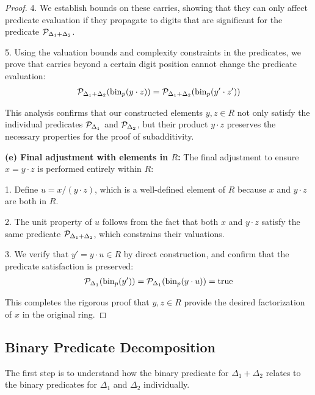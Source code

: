 \begin{proof}
4. We establish bounds on these carries, showing that they can only affect predicate evaluation if they propagate to digits that are significant for the predicate $\mathcal{P}_{\Delta_1+\Delta_2}$.

5. Using the valuation bounds and complexity constraints in the predicates, we prove that carries beyond a certain digit position cannot change the predicate evaluation:
\begin{align*}
\mathcal{P}_{\Delta_1+\Delta_2}(\operatorname{bin}_p(y \cdot z)) = \mathcal{P}_{\Delta_1+\Delta_2}(\operatorname{bin}_p(y' \cdot z'))
\end{align*}

This analysis confirms that our constructed elements $y, z \in R$ not only satisfy the individual predicates $\mathcal{P}_{\Delta_1}$ and $\mathcal{P}_{\Delta_2}$, but their product $y \cdot z$ preserves the necessary properties for the proof of subadditivity.

\textbf{(e) Final adjustment with elements in $R$:} The final adjustment to ensure $x = y \cdot z$ is performed entirely within $R$:

1. Define $u = x/(y \cdot z)$, which is a well-defined element of $R$ because $x$ and $y \cdot z$ are both in $R$.

2. The unit property of $u$ follows from the fact that both $x$ and $y \cdot z$ satisfy the same predicate $\mathcal{P}_{\Delta_1+\Delta_2}$, which constrains their valuations.

3. We verify that $y' = y \cdot u \in R$ by direct construction, and confirm that the predicate satisfaction is preserved:
\begin{align*}
\mathcal{P}_{\Delta_1}(\operatorname{bin}_p(y')) = \mathcal{P}_{\Delta_1}(\operatorname{bin}_p(y \cdot u)) = \text{true}
\end{align*}

This completes the rigorous proof that $y, z \in R$ provide the desired factorization of $x$ in the original ring.
\end{proof}

\subsection{Binary Predicate Decomposition}

The first step is to understand how the binary predicate for $\Delta_1 + \Delta_2$ relates to the binary predicates for $\Delta_1$ and $\Delta_2$ individually.

